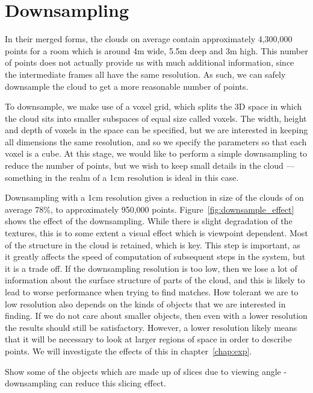\documentclass[11pt,a4paper]{kth-mag}
\begin{document}
\section{Downsampling}
In their merged forms, the clouds on average contain approximately 4,300,000
points for a room which is around 4m wide, 5.5m deep and 3m high. This number of
points does not actually provide us with much additional information, since the
intermediate frames all have the same resolution. As such, we can safely
downsample the cloud to get a more reasonable number of points.

To downsample, we make use of a voxel grid, which splits the 3D space in which
the cloud sits into smaller subspaces of equal size called voxels. The width,
height and depth of voxels in the space can be specified, but we are interested
in keeping all dimensions the same resolution, and so we specify the parameters
so that each voxel is a cube. At this stage, we would like to perform a simple
downsampling to reduce the number of points, but we wish to keep small details
in the cloud --- something in the realm of a 1cm resolution is ideal in this
case.

Downsampling with a 1cm resolution gives a reduction in size of the clouds of on
average 78\%, to approximately 950,000 points.
Figure~\ref{fig:downsample_effect} shows the effect of the downsampling. While
there is slight degradation of the textures, this is to some extent a visual
effect which is viewpoint dependent. Most of the structure in the cloud is
retained, which is key. This step is important, as it greatly affects the speed
of computation of subsequent steps in the system, but it is a trade off. If the
downsampling resolution is too low, then we lose a lot of information about the
surface structure of parts of the cloud, and this is likely to lead to worse
performance when trying to find matches. How tolerant we are to low resolution
also depends on the kinds of objects that we are interested in finding. If we do
not care about smaller objects, then even with a lower resolution the results
should still be satisfactory. However, a lower resolution likely means that it
will be necessary to look at larger regions of space in order to describe
points. We will investigate the effects of this in chapter~\ref{chap:exp}.

Show some of the objects which are made up of slices due to viewing angle -
downsampling can reduce this slicing effect.
\end{document}
